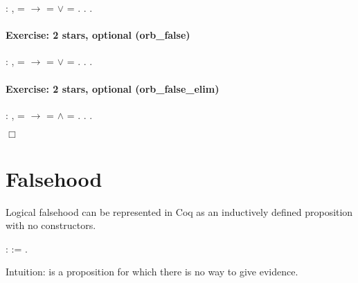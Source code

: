 \documentclass[12pt]{report}
\begin{document}
\begin{coqdoccode}
\coqdocnoindent
{}  : \coqdockw{\ensuremath{\forall}}  ,\coqdoceol
\coqdocindent{1.00em}
   =  \ensuremath{\rightarrow}  =  \ensuremath{\lor}  = .\coqdoceol
\coqdocnoindent
{}.\coqdoceol
 .\coqdoceol
\coqdocemptyline
\end{coqdoccode}
\paragraph{Exercise: 2 stars, optional (orb\_false)}

\begin{coqdoccode}
\coqdocnoindent
{}  : \coqdockw{\ensuremath{\forall}}  ,\coqdoceol
\coqdocindent{1.00em}
   =  \ensuremath{\rightarrow}  =  \ensuremath{\lor}  = .\coqdoceol
\coqdocnoindent
{}.\coqdoceol
 .\coqdoceol
\coqdocemptyline
\end{coqdoccode}
\paragraph{Exercise: 2 stars, optional (orb\_false\_elim)}

\begin{coqdoccode}
\coqdocnoindent
{}  : \coqdockw{\ensuremath{\forall}}  ,\coqdoceol
\coqdocindent{1.00em}
   =  \ensuremath{\rightarrow}  =  \ensuremath{\land}  = .\coqdoceol
\coqdocnoindent
{}.\coqdoceol
 .\coqdoceol
\end{coqdoccode}
\ensuremath{\Box} \begin{coqdoccode}
\coqdocemptyline
\end{coqdoccode}
\section{Falsehood}



 Logical falsehood can be represented in Coq as an inductively
    defined proposition with no constructors. \begin{coqdoccode}
\coqdocemptyline
\coqdocnoindent
{}  :  := .\coqdoceol
\coqdocemptyline
\end{coqdoccode}
Intuition:  is a proposition for which there is no way
    to give evidence. 
\end{document}
